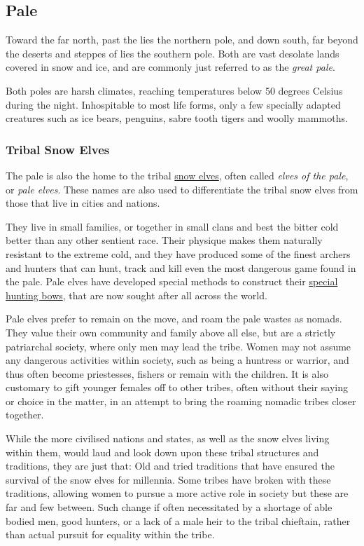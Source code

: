 \subsection{Pale}
\label{sec:Pale}

Toward the far north, past the  lies the northern
pole, and down south, far beyond the deserts and steppes of 
lies the southern pole. Both are vast desolate lands covered in snow and ice,
and are commonly just referred to as the \emph{great pale}.

Both poles are harsh climates, reaching temperatures below 50 degrees Celsius
during the night. Inhospitable to most life forms, only a few specially adapted
creatures such as ice bears, penguins, sabre tooth tigers and woolly mammoths.

\subsubsection{Tribal Snow Elves}
\label{sec:Tribal Snow Elves}

The pale is also the home to the tribal \hyperref[sec:Snow Elves]{snow elves},
often called \emph{elves of the pale}, or \emph{pale elves}. These names are
also used to differentiate the tribal snow elves from those that live in
cities and nations.

They live in small families, or together in small clans and best the bitter
cold better than any other sentient race. Their physique makes them naturally
resistant to the extreme cold, and they have produced some of the finest
archers and hunters that can hunt, track and kill even the most dangerous game
found in the pale. Pale elves have developed special methods to construct
their \hyperref[sec:Snow Elf Bow]{special hunting bows}, that are now sought
after all across the world.

Pale elves prefer to remain on the move, and roam the pale wastes as nomads.
They value their own community and family above all else, but are a strictly
patriarchal society, where only men may lead the tribe. Women may not assume
any dangerous activities within society, such as being a huntress or warrior,
and thus often become priestesses, fishers or remain with the children. It
is also customary to gift younger females off to other tribes, often without
their saying or choice in the matter, in an attempt to bring the roaming
nomadic tribes closer together.

While the more civilised nations and states, as well as the snow elves living
within them, would laud and look down upon these tribal structures and
traditions, they are just that: Old and tried traditions that have ensured the
survival of the snow elves for millennia. Some tribes have broken with these
traditions, allowing women to pursue a more active role in society but these
are far and few between. Such change if often necessitated by a shortage of
able bodied men, good hunters, or a lack of a male heir to the tribal
chieftain, rather than actual pursuit for equality within the tribe.

